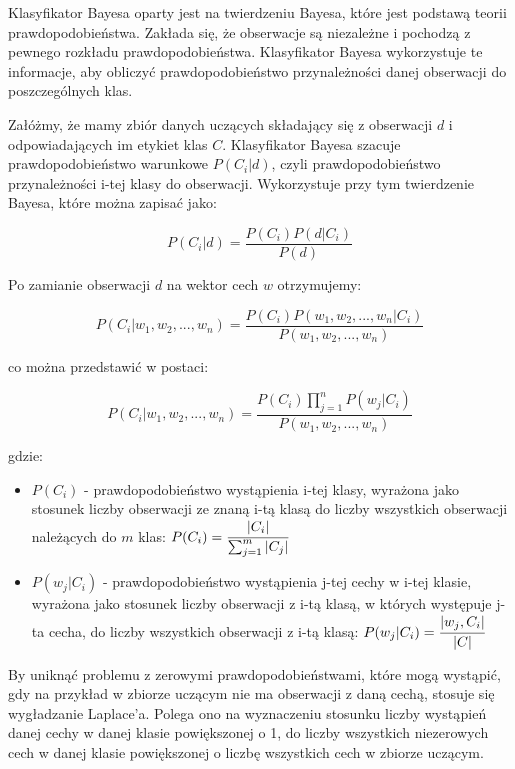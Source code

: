 \documentclass{article}
\begin{document}
Klasyfikator Bayesa oparty jest na twierdzeniu Bayesa, 
które jest podstawą teorii prawdopodobieństwa. Zakłada 
się, że obserwacje są niezależne i pochodzą z pewnego 
rozkładu prawdopodobieństwa. Klasyfikator Bayesa 
wykorzystuje te informacje, aby obliczyć prawdopodobieństwo 
przynależności danej obserwacji do poszczególnych klas.

Załóżmy, że mamy zbiór danych uczących składający się z 
obserwacji $d$ i odpowiadających im etykiet klas $C$. 
Klasyfikator Bayesa szacuje prawdopodobieństwo warunkowe 
$P(C_i|d)$, czyli prawdopodobieństwo przynależności i-tej
klasy do obserwacji. Wykorzystuje przy tym 
twierdzenie Bayesa, które można zapisać jako:

\begin{equation}
    P(C_i|d) = \frac{P(C_i)P(d|C_i)}{P(d)}
\end{equation}

Po zamianie obserwacji $d$ na wektor cech $w$ otrzymujemy:

\begin{equation}
    P(C_i|w_1, w_2, ..., w_n) = \frac{P(C_i)P(w_1, w_2, ..., w_n|C_i)}{P(w_1, w_2, ..., w_n)}
\end{equation}

co można przedstawić w postaci:

\begin{equation}
    P(C_i|w_1, w_2, ..., w_n) = \frac{P(C_i)\prod_{j=1}^{n}P(w_j|C_i)}{P(w_1, w_2, ..., w_n)}
\end{equation}

gdzie:
\begin{itemize}
    \item $P(C_i)$ - prawdopodobieństwo wystąpienia i-tej klasy, wyrażona jako 
    stosunek liczby obserwacji ze znaną i-tą klasą do liczby wszystkich obserwacji
    należących do $m$ klas:
    $P(C_i) = \cfrac{|C_i|}{\sum_{j=1}^{m}|C_j|}$
    \item $P(w_j|C_i)$ - prawdopodobieństwo wystąpienia j-tej cechy w i-tej klasie,
    wyrażona jako stosunek liczby obserwacji z i-tą klasą, w których występuje j-ta cecha,
    do liczby wszystkich obserwacji z i-tą klasą:
    $P(w_j|C_i) = \cfrac{|w_j, C_i|}{|C|}$
\end{itemize}

By uniknąć problemu z zerowymi prawdopodobieństwami,
które mogą wystąpić, gdy na przykład w zbiorze uczącym nie ma obserwacji
z daną cechą, stosuje się wygładzanie Laplace'a. Polega ono
na wyznaczeniu stosunku liczby wystąpień danej cechy w danej klasie
powiększonej o 1, do liczby wszystkich niezerowych cech w danej klasie powiększonej
o liczbę wszystkich cech w zbiorze uczącym.
\end{document}
